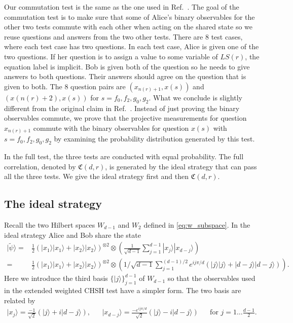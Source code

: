 \documentclass[11pt,letterpaper]{article}
\newcommand{\ket}[1]{|#1\rangle}
\newcommand{\x}{\otimes}
\newcommand{\calY}{\mathcal{Y}}
\newcommand{\1}{\mathbb{1}}
\newcommand{\LS}{LS}
\newcommand{\tpsi}{\tilde{\psi}}
\newcommand{\nr}{n(r)}
\newcommand{\fC}{\mathfrak{C}}
\theoremstyle{definition}
\begin{document}
Our commutation test is the same as the one used in Ref.~\cite{coladan2017verifier}.
The goal of the commutation test is to make sure that some
of Alice's binary observables for the other two tests 
commute with each other when acting on the shared state
so we reuse questions and answers from the two other tests.
There are $8$ test cases, where each test case has two questions. 
In each test case, Alice is given one of the two questions.
If her question is to assign a value to some variable of $\LS(r)$,
the equation label is implicit.
Bob is given both of the question so he needs to give answers to both questions.
Their answers should agree on the question that is given to both.
The $8$ question pairs are $(x_{\nr+1}, x(s))$ and $(x(\nr+2), x(s))$ for
$s = f_0, f_2, g_0, g_2$.
What we conclude is slightly different from the original claim
in Ref.~\cite{coladan2017verifier}.
Instead of just proving the binary observables commute,
we prove that the projective measurements
for question $x_{\nr+1}$ commute with the binary observables for question
$x(s)$ with $s = f_0, f_2, g_0, g_2$ 
by examining the probability distribution generated by this test.


In the full test, the three tests are conducted with equal probability.
The full correlation, denoted by $\fC(d,r)$, is generated by the ideal strategy that can pass all the three tests. We give the ideal strategy first and then $\fC(d,r)$.
\subsection{The ideal strategy}
\label{sec:ideal_strat}
Recall the two Hilbert spaces $W_{d-1}$ and $W_2$ defined in \cref{eq:w_subspace}. 
In the ideal strategy Alice and Bob share the state 
\begin{equation}
    \label{eq:tpsi}
    \begin{aligned}
        \ket{\tpsi} = &\frac{1}{2} (\ket{x_1}\ket{x_1} + \ket{x_2}\ket{x_2})^{\x 2} \x \left(\frac{1}{\sqrt{d-1}} \sum_{j=1}^{d-1} \ket{x_j}\ket{x_{d-j}}\right)\\
        =&\frac{1}{2} (\ket{x_1}\ket{x_1} + \ket{x_2}\ket{x_2})^{\x 2} \x \left(1/\sqrt{d-1} \sum_{j=1}^{(d-1)/2} e^{ij\pi/d}(\ket{j}\ket{j} + \ket{d-j}\ket{d-j})\right).
    \end{aligned}
\end{equation}
Here we introduce the third basis $\{ \ket{j} \}_{j=1}^{d-1}$ of $W_{d-1}$ so that
the observables used in the extended weighted CHSH test have a simpler form.
The two basis are related by
\begin{align*}
	\ket{x_j} = \frac{-1}{\sqrt{2}}(\ket{j} + i\ket{d-j}), &&
	\ket{x_{d-j}} = \frac{-e^{ij\pi/d}}{\sqrt{2}}(\ket{j} - i\ket{d-j}) && \text{for } j = 1 \dots \frac{d-1}{2}.
\end{align*}
\end{document}
